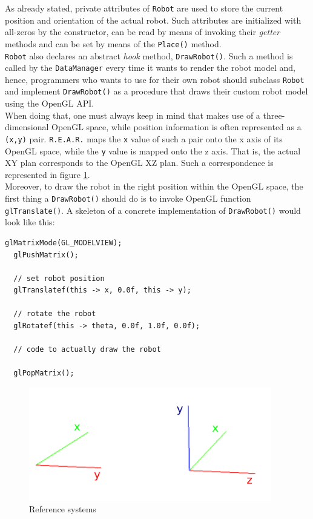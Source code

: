 As already stated, private attributes of \texttt{Robot} 
are used to store the current position and orientation 
of the actual robot. Such attributes are initialized with 
all-zeros by the constructor, can be read by means 
of invoking their \textit{getter} methods and can be set 
by means of the \texttt{Place()} method.
\\
\texttt{Robot} also declares an abstract \textit{hook} method, 
\texttt{DrawRobot()}. Such a method is called by the 
\texttt{DataManager} every time it wants to render the 
robot model and, hence, programmers who wants to 
use \framework{} for their own robot should subclass 
\texttt{Robot} and implement \texttt{DrawRobot()} as a 
procedure that draws their custom robot model using 
the OpenGL API.
\\
When doing that, one must always keep in mind that 
\framework{} makes use of a three-dimensional OpenGL 
space, while position information is often represented 
as a \texttt{(x,y)} pair. \texttt{R.E.A.R.} maps the \texttt{x} 
value of such a pair onto the x axis of its OpenGL space, 
while the \texttt{y} value is mapped onto the z axis.
That is, the actual XY plan corresponds to the OpenGL 
XZ plan. Such a correspondence is represented in figure 
\ref{fig:reference_systems}.
\\
Moreover, to draw the robot in the right position within 
the OpenGL space, the first thing a \texttt{DrawRobot()} should 
do is to invoke OpenGL function \texttt{glTranslate()}.
A skeleton of a concrete implementation of \texttt{DrawRobot()}
would look like this:
\\
\begin{lstlisting}[caption={\texttt{DrawRobot()} skeleton}, label={code:drawrobot_skeleton}]  
  glMatrixMode(GL_MODELVIEW);
  glPushMatrix();

  // set robot position
  glTranslatef(this -> x, 0.0f, this -> y);

  // rotate the robot 
  glRotatef(this -> theta, 0.0f, 1.0f, 0.0f);

  // code to actually draw the robot

  glPopMatrix();
\end{lstlisting}

\begin{figure}[!h]
  \begin{center}
    \includegraphics[width=300pt]{img/reference_system.png}
    \caption{Reference systems}
    \label{fig:reference_systems}
  \end{center}
\end{figure}


